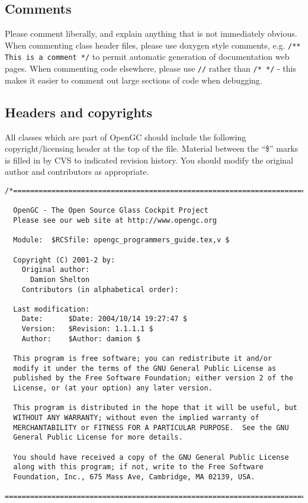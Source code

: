 \documentclass[11pt]{article}
\begin{document}
\subsection{Comments}
Please comment liberally, and explain anything that is not immediately obvious. When commenting class header files, please use doxygen style comments, e.g. \texttt{/** This is a comment */} to permit automatic generation of documentation web pages. When commenting code elsewhere, please use \texttt{//} rather than \texttt{/* */} - this makes it easier to comment out large sections of code when debugging.

\subsection{Headers and copyrights}

All classes which are part of OpenGC should include the following copyright/licensing header at the top of the file. Material between the ``\$'' marks is filled in by CVS to indicated revision history. You should modify the original author and contributors as appropriate.

\begin{verbatim}
/*=========================================================================

  OpenGC - The Open Source Glass Cockpit Project
  Please see our web site at http://www.opengc.org
  
  Module:  $RCSfile: opengc_programmers_guide.tex,v $

  Copyright (C) 2001-2 by:
    Original author:
      Damion Shelton
    Contributors (in alphabetical order):

  Last modification:
    Date:      $Date: 2004/10/14 19:27:47 $
    Version:   $Revision: 1.1.1.1 $
    Author:    $Author: damion $
  
  This program is free software; you can redistribute it and/or
  modify it under the terms of the GNU General Public License as
  published by the Free Software Foundation; either version 2 of the
  License, or (at your option) any later version.

  This program is distributed in the hope that it will be useful, but
  WITHOUT ANY WARRANTY; without even the implied warranty of
  MERCHANTABILITY or FITNESS FOR A PARTICULAR PURPOSE.  See the GNU
  General Public License for more details.

  You should have received a copy of the GNU General Public License
  along with this program; if not, write to the Free Software
  Foundation, Inc., 675 Mass Ave, Cambridge, MA 02139, USA.

=========================================================================*/
\end{verbatim}
\end{document}
